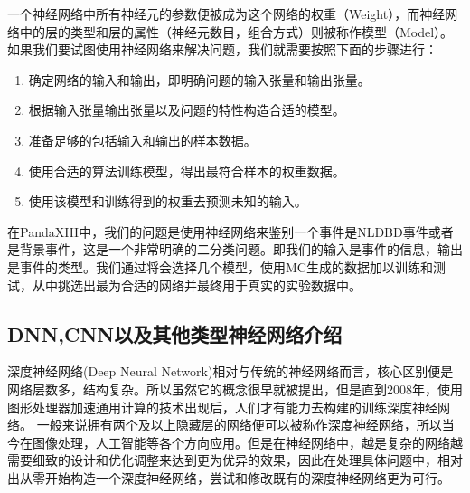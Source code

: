 一个神经网络中所有神经元的参数便被成为这个网络的权重（Weight），而神经网络中的层的类型和层的属性（神经元数目，组合方式）则被称作模型（Model）。如果我们要试图使用神经网络来解决问题，我们就需要按照下面的步骤进行：
\begin{enumerate}
    \item 确定网络的输入和输出，即明确问题的输入张量和输出张量。
    \item 根据输入张量输出张量以及问题的特性构造合适的模型。
    \item 准备足够的包括输入和输出的样本数据。
    \item 使用合适的算法训练模型，得出最符合样本的权重数据。
    \item 使用该模型和训练得到的权重去预测未知的输入。
\end{enumerate}
在PandaXIII中，我们的问题是使用神经网络来鉴别一个事件是NLDBD事件或者是背景事件，这是一个非常明确的二分类问题。即我们的输入是事件的信息，输出是事件的类型。我们通过将会选择几个模型，使用MC生成的数据加以训练和测试，从中挑选出最为合适的网络并最终用于真实的实验数据中。

\subsection{DNN,CNN以及其他类型神经网络介绍}

深度神经网络(Deep Neural Network)相对与传统的神经网络而言，核心区别便是网络层数多，结构复杂。所以虽然它的概念很早就被提出，但是直到2008年，使用图形处理器加速通用计算的技术出现后，人们才有能力去构建的训练深度神经网络。 一般来说拥有两个及以上隐藏层的网络便可以被称作深度神经网络，所以当今在图像处理，人工智能等各个方向应用。但是在神经网络中，越是复杂的网络越需要细致的设计和优化调整来达到更为优异的效果，因此在处理具体问题中，相对出从零开始构造一个深度神经网络，尝试和修改既有的深度神经网络更为可行。

